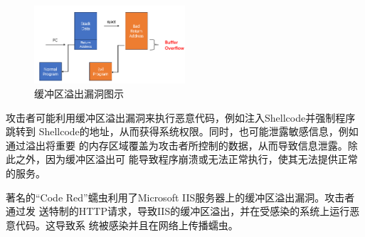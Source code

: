 \begin{figure}[htbp]
  \centering
  \includegraphics[width=0.5\textwidth]{pictures/Buffer Overflow.png}
  \caption{缓冲区溢出漏洞图示}
  \label{fig:BO}
\end{figure}
	
攻击者可能利用缓冲区溢出漏洞来执行恶意代码，例如注入Shellcode并强制程序跳转到
Shellcode的地址，从而获得系统权限。同时，也可能泄露敏感信息，例如通过溢出将重要
的内存区域覆盖为攻击者所控制的数据，从而导致信息泄露。除此之外，因为缓冲区溢出可
能导致程序崩溃或无法正常执行，使其无法提供正常的服务。

著名的``Code Red''蠕虫利用了Microsoft IIS服务器上的缓冲区溢出漏洞。攻击者通过发
送特制的HTTP请求，导致IIS的缓冲区溢出，并在受感染的系统上运行恶意代码。这导致系
统被感染并且在网络上传播蠕虫。
	